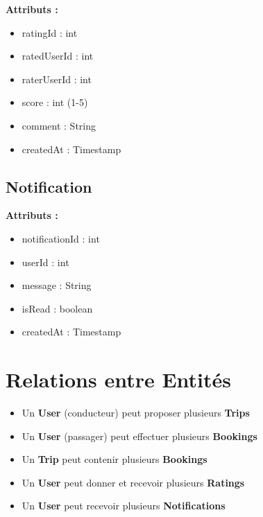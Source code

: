 \documentclass[12pt,a4paper]{report}
\begin{document}
\begin{tcolorbox}[colback=yellow!5,colframe=yellow!75!black,title=Classe Rating]
\textbf{Attributs :}
\begin{itemize}[noitemsep]
    \item ratingId : int
    \item ratedUserId : int
    \item raterUserId : int
    \item score : int (1-5)
    \item comment : String
    \item createdAt : Timestamp
\end{itemize}
\end{tcolorbox}

\subsection{Notification}

\begin{tcolorbox}[colback=purple!5,colframe=purple!75!black,title=Classe Notification]
\textbf{Attributs :}
\begin{itemize}[noitemsep]
    \item notificationId : int
    \item userId : int
    \item message : String
    \item isRead : boolean
    \item createdAt : Timestamp
\end{itemize}
\end{tcolorbox}

\section{Relations entre Entités}

\begin{itemize}
    \item Un \textbf{User} (conducteur) peut proposer plusieurs \textbf{Trips}
    \item Un \textbf{User} (passager) peut effectuer plusieurs \textbf{Bookings}
    \item Un \textbf{Trip} peut contenir plusieurs \textbf{Bookings}
    \item Un \textbf{User} peut donner et recevoir plusieurs \textbf{Ratings}
    \item Un \textbf{User} peut recevoir plusieurs \textbf{Notifications}
\end{itemize}
\end{document}
